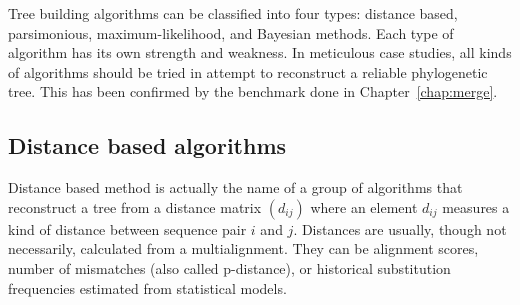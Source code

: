 Tree building algorithms can be classified into four types: distance based, parsimonious,
maximum-likelihood, and Bayesian methods. Each type of algorithm has its own strength and
weakness. In meticulous case studies, all kinds of algorithms should be tried in attempt
to reconstruct a reliable phylogenetic tree. This has been confirmed by the benchmark
done in Chapter~\ref{chap:merge}.

\subsection{Distance based algorithms}
Distance based method is actually the name of a group of algorithms that reconstruct a tree
from a distance matrix $(d_{ij})$ where an element $d_{ij}$ measures a kind of distance
between sequence pair $i$ and $j$. Distances are usually, though not necessarily,
calculated from a multialignment. They can be alignment scores, number of mismatches
(also called p-distance), or historical substitution frequencies estimated from
statistical models.

